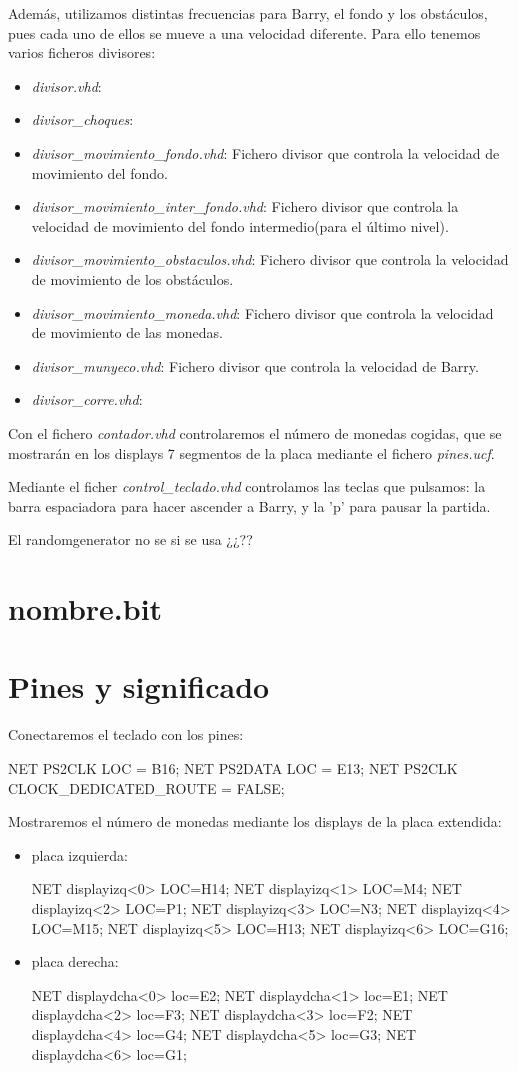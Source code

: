\documentclass[11pt, a4paper, spanish, openright, twoside]{book}
\begin{document}
Además, utilizamos distintas frecuencias para Barry, el fondo y los obstáculos, pues cada uno de ellos se mueve a una velocidad diferente. Para ello tenemos varios ficheros divisores:
\begin{itemize}
\item \textit{divisor.vhd}: 
\item \textit{divisor_choques}: 
\item \textit{divisor_movimiento_fondo.vhd}: Fichero divisor que controla la velocidad de movimiento del fondo.
\item \textit{divisor_movimiento_inter_fondo.vhd}: Fichero divisor que controla la velocidad de movimiento del fondo intermedio(para el último nivel).
\item \textit{divisor_movimiento_obstaculos.vhd}: Fichero divisor que controla la velocidad de movimiento de los obstáculos.
\item \textit{divisor_movimiento_moneda.vhd}: Fichero divisor que controla la velocidad de movimiento de las monedas.
\item \textit{divisor_munyeco.vhd}: Fichero divisor que controla la velocidad de Barry.
\item \textit{divisor_corre.vhd}: 
\end{itemize}

Con el fichero \textit{contador.vhd} controlaremos el número de monedas cogidas, que se mostrarán en los displays 7 segmentos de la placa mediante el fichero \textit{pines.ucf}.

Mediante el ficher \textit{control_teclado.vhd} controlamos las teclas que pulsamos: la barra espaciadora para hacer ascender a Barry, y la 'p' para pausar la partida.

El randomgenerator no se si se usa ¿¿??


\section{nombre.bit}


\section{Pines y significado}
Conectaremos el teclado con los pines:

NET PS2CLK LOC = B16;
NET PS2DATA LOC = E13;
NET PS2CLK CLOCK_DEDICATED_ROUTE = FALSE;

Mostraremos el número de monedas mediante los displays de la placa extendida:
\begin{itemize}
\item placa izquierda:

NET displayizq<0> LOC=H14;
NET displayizq<1> LOC=M4;
NET displayizq<2> LOC=P1;
NET displayizq<3> LOC=N3;
NET displayizq<4> LOC=M15;
NET displayizq<5> LOC=H13;
NET displayizq<6> LOC=G16;

\item placa derecha:

NET displaydcha<0> loc=E2;
NET displaydcha<1> loc=E1;
NET displaydcha<2> loc=F3;
NET displaydcha<3> loc=F2;
NET displaydcha<4> loc=G4;
NET displaydcha<5> loc=G3;
NET displaydcha<6> loc=G1;
\end{itemize}
\end{document}
